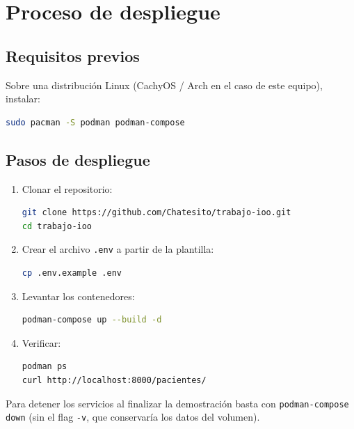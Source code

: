 \documentclass[12pt,a4paper]{article}
\begin{document}
\section{Proceso de despliegue}

\subsection{Requisitos previos}

Sobre una distribución Linux (CachyOS / Arch en el caso de este equipo), instalar:

\begin{lstlisting}[language=bash]
sudo pacman -S podman podman-compose
\end{lstlisting}

\subsection{Pasos de despliegue}

\begin{enumerate}
    \item Clonar el repositorio:
    \begin{lstlisting}[language=bash]
git clone https://github.com/Chatesito/trabajo-ioo.git
cd trabajo-ioo
    \end{lstlisting}

    \item Crear el archivo \texttt{.env} a partir de la plantilla:
    \begin{lstlisting}[language=bash]
cp .env.example .env
    \end{lstlisting}

    \item Levantar los contenedores:
    \begin{lstlisting}[language=bash]
podman-compose up --build -d
    \end{lstlisting}

    \item Verificar:
    \begin{lstlisting}[language=bash]
podman ps
curl http://localhost:8000/pacientes/
    \end{lstlisting}
\end{enumerate}

Para detener los servicios al finalizar la demostración basta con \texttt{podman-compose down} (sin el flag \texttt{-v}, que conservaría los datos del volumen).
\end{document}

